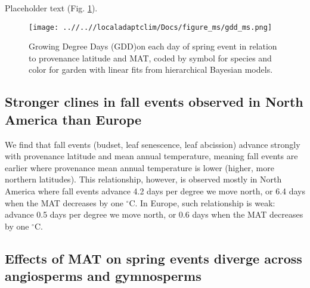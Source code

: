 \documentclass{article}
\begin{document}

Placeholder text (Fig. \ref{figure:gdd}).

\begin{figure}[!h] 
    \centering
 \texttt{[image: ..//..//localadaptclim/Docs/figure\_ms/gdd\_ms.png]}
    \caption{Growing Degree Days (GDD)on each day of spring event in relation to provenance latitude and MAT, coded by symbol for species and color for garden with linear fits from hierarchical Bayesian models.}
    \label{figure:gdd}
\end{figure}


\newpage


\subsection{Stronger clines in fall events observed in North America than Europe}





We find that fall events (budset, leaf senescence, leaf abcission) advance strongly with provenance latitude and mean annual temperature, meaning fall events are earlier where provenance mean annual temperature is lower (higher, more northern latitudes). This relationship, however, is observed mostly in North America where fall events advance 4.2 days per degree we move north, or 6.4 days when the MAT decreases by one $^{\circ}$C. In Europe, such relationship is weak: advance 0.5 days per degree we move north, or 0.6 days when the MAT decreases by one $^{\circ}$C.

\subsection{Effects of MAT on spring events diverge across angiosperms and gymnosperms}
\end{document}
